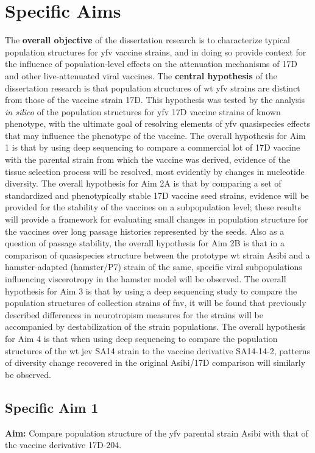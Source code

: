 \section{Specific Aims}
The \textbf{overall objective} of the dissertation research is to characterize typical population structures for \gls{yfv} vaccine strains, and in doing so provide context for the influence of population-level effects on the attenuation mechanisms of 17D and other live-attenuated viral vaccines. The \textbf{central hypothesis} of the dissertation research is that population structures of \gls{wt} \gls{yfv} strains are distinct from those of the vaccine strain 17D. This hypothesis was tested by the analysis \emph{in silico} of the population structures for \gls{yfv} 17D vaccine strains of known phenotype, with the ultimate goal of resolving elements of \gls{yfv} quasispecies effects that may influence the phenotype of the vaccine. The overall hypothesis for Aim 1 is that by using deep sequencing to compare a commercial lot of 17D vaccine with the parental strain from which the vaccine was derived, evidence of the tissue selection process will be resolved, most evidently by changes in nucleotide diversity. The overall hypothesis for Aim 2A is that by comparing a set of standardized and phenotypically stable 17D vaccine seed strains, evidence will be provided for the stability of the vaccines on a subpopulation level; these results will provide a framework for evaluating small changes in population structure for the vaccines over long passage histories represented by the seeds. Also as a question of passage stability, the overall hypothesis for Aim 2B is that in a comparison of quasispecies structure between the prototype \gls{wt} strain Asibi and a hamster-adapted (hamster/P7) strain of the same, specific viral subpopulations influencing viscerotropy in the hamster model will be observed. The overall hypothesis for Aim 3 is that by using a deep sequencing study to compare the population structures of collection strains of \gls{fnv}, it will be found that previously described differences in neurotropism measures for the strains will be accompanied by destabilization of the strain populations. The overall hypothesis for Aim 4 is that when using deep sequencing to compare the population structures of the \gls{wt} \gls{jev} SA14 strain to the vaccine derivative SA14-14-2, patterns of diversity change recovered in the original Asibi/17D comparison will similarly be observed.

\subsection{Specific Aim 1}
\textbf{Aim:} Compare population structure of the \gls{yfv} parental strain Asibi with that of the vaccine derivative 17D-204.

